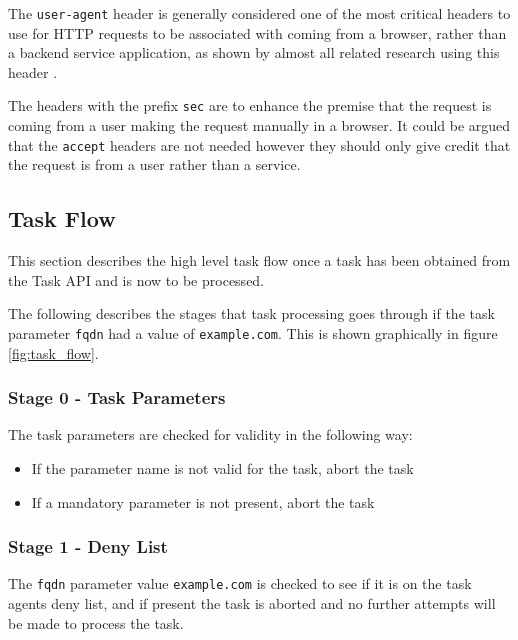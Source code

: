\documentclass{mscreport}
\begin{document}
\vspace{0.3cm} \noindent
The \texttt{user-agent} header is generally considered one of the most critical headers to use for HTTP requests to be associated with coming from a browser, rather than a backend service application, as shown by almost all related research using this header \cite{Patil2017-bg,Buchanan2018-xz,Amann2017-co,Kotzias2018-wd,Poteat2021-zr,Van_Goethem2014-ao,Chen2016-dl,Kumar2017-qw,Michael2015-hn}.

\vspace{0.3cm} \noindent
The headers with the prefix \texttt{sec} are to enhance the premise that the request is coming from a user making the request manually in a browser. It could be argued that the \texttt{accept} headers are not needed however they should only give credit that the request is from a user rather than a service.

\subsection{Task Flow}
\label{section:task_flow}

This section describes the high level task flow once a task has been obtained from the Task API and is now to be processed.

\vspace{0.3cm} \noindent
The following describes the stages that task processing goes through if the task parameter \texttt{fqdn} had a value of \texttt{example.com}. This is shown graphically in figure \ref{fig:task_flow}.

\subsubsection{Stage 0 - Task Parameters}

The task parameters are checked for validity in the following way:
\begin{itemize}
	\setlength\itemsep{0.1em}
    \item If the parameter name is not valid for the task, abort the task
    \item If a mandatory parameter is not present, abort the task
\end{itemize}

\subsubsection{Stage 1 - Deny List}

The \texttt{fqdn} parameter value \texttt{example.com} is checked to see if it is on the task agents deny list, and if present the task is aborted and no further attempts will be made to process the task.
\end{document}
